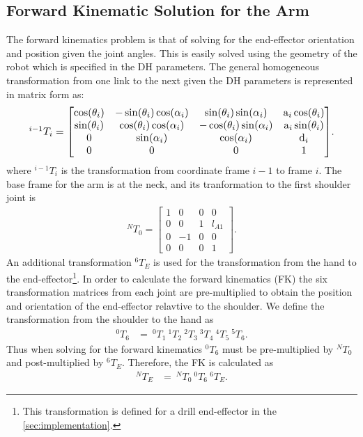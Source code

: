 \documentclass[letterpaper, 10 pt, conference]{IEEEtran}
\begin{document}
\subsection{Forward Kinematic Solution for the Arm}
The forward kinematics problem is that of solving for the end-effector orientation and position given the joint angles. This is easily solved using the geometry of the robot which is specified in the DH parameters. The general homogeneous transformation from one link to the next given the DH parameters is represented in matrix form as:
\begin{equation}\label{eq:transformDHMatrix}\resizebox{.9\hsize}{!}{$
^{i-1}T_i = 
	\begin{bmatrix}
		\cos(\theta_i) & -\sin(\theta_i)\cos(\alpha_i) & \sin(\theta_i)\sin(\alpha_i) & \mathrm{a}_i\cos(\theta_i) \\%
    	\sin(\theta_i) & \cos(\theta_i)\cos(\alpha_i) & \mathrm{-}\cos(\theta_i)\sin(\alpha_i) & \mathrm{a}_i\sin(\theta_i) \\%
    	0 & \sin(\alpha_i) & \cos(\alpha_i) & \mathrm{d}_i \\%
  		0 & 0 & 0 & 1
	\end{bmatrix}$}.
\end{equation}
where ${^{i-1}T_i}$ is the transformation from coordinate frame $i-1$ to frame $i$. The base frame for the arm is at the neck, and its tranformation to the first shoulder joint is 
\begin{align}\label{eq:neckMatrix}
^NT_0= \begin{bmatrix}
	1 & 0 & 0 & 0 \\
	0 & 0 & 1 & l_{A1} \\
	0 &-1 & 0 & 0 \\
	0 & 0 & 0 & 1
\end{bmatrix}.
\end{align}
An additional transformation $^6T_E$ is used for the transformation from the hand to the end-effector\footnote{This transformation is defined for a drill end-effector in the \cref{sec:implementation}.}.
In order to calculate the forward kinematics (FK) the six transformation matrices from each joint are pre-multiplied to obtain the position and orientation of the end-effector relavtive to the shoulder. We define the transformation from the shoulder to the hand as
\begin{align} \label{eq:shoulderToHandTransform}
^0T_6 &=\:^0T_1\:^1T_2\:^2T_3\:^3T_4\:^4T_5\:^5T_6.
\end{align}
Thus when solving for the forward kinematics $^0T_6$ must be pre-multiplied by $^NT_0$ and post-multiplied by $^6T_E$. Therefore, the FK is calculated as 
\begin{align} \label{eq:armFK}
^NT_E &=\:^NT_0\:^0T_6\:^6T_E.
\end{align}
\end{document}
